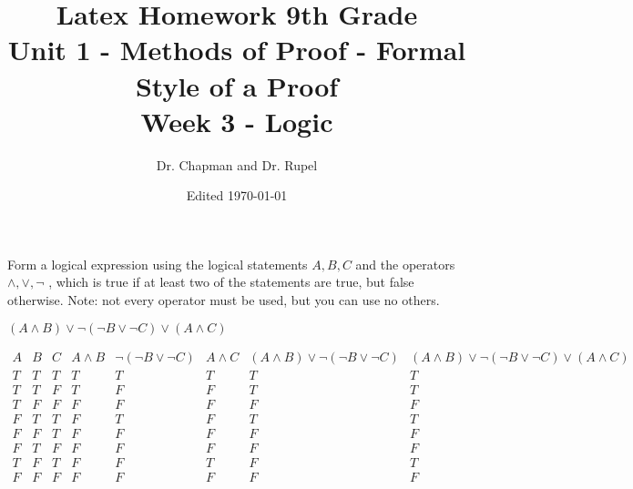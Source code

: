 \documentclass{article}
\title{Latex Homework 9th Grade\\ Unit 1 - Methods of Proof - Formal Style of a Proof\\ Week 3 - Logic}
\author{Dr. Chapman and Dr. Rupel}
\date{Edited \today}
\begin{document}
\maketitle

\section{}
    Form a logical expression using the logical statements \(A,B,C\) and the operators \(\wedge,\vee,\neg\) , which is true if at least two of the statements are true, but false otherwise. Note: not every operator must be used, but you can use no others.

$(A\land B)\lor\neg(\neg B \lor \neg C)\lor(A \land C)$


$\begin{array}{c|c|c|c|c|c|c|c}A&B&C& A\land B& \neg(\neg B\lor \neg C)&A\land C&(A\land B)\lor\neg(\neg B\lor\neg C)&(A\land B)\lor\neg(\neg B\lor\neg C)\lor(A\land C)\\
\hline T&T&T&T&T&T&T&T \\ \hline T&T&F&T&F&F&T&T \\ \hline T&F&F&F&F&F&F&F \\ \hline F&T&T&F&T&F&T&T \\ \hline F&F&T&F&F&F&F&F
\\ \hline F&T&F&F&F&F&F&F \\ \hline T&F&T&F&F&T&F&T \\ \hline F&F&F&F&F&F&F&F
\end{array}$
\end{document}

